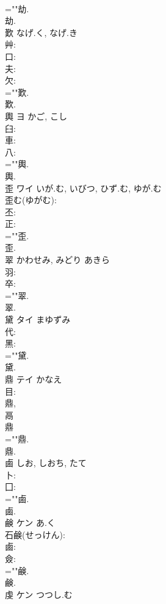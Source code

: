 \documentclass[8pt]{extreport}
\begin{document}
\begin{CJK}{UTF8}{min}
\\	=""劫.
\\	劫.
\\	歎		なげ.く, なげ.き				
\\	艸: 
\\	口: 
\\	夫: 
\\	欠: 
\\	=""歎.
\\	歎.
\\	輿	ヨ	かご, こし		
\\	臼: 
\\	車: 
\\	八: 
\\	=""輿.
\\	輿.
\\	歪	ワイ	いが.む, いびつ, ひず.む, ゆが.む		
\\	歪む(ゆがむ): 
\\	丕: 
\\	正: 
\\	=""歪.
\\	歪.
\\	翠		かわせみ, みどり	あきら			
\\	羽: 
\\	卒: 
\\	=""翠.
\\	翠.
\\	黛	タイ	まゆずみ		
\\	代: 
\\	黑: 
\\	=""黛.
\\	黛.
\\	鼎	テイ	かなえ		
\\	目: 
\\	鼎, 
\\	鬲 
\\	鼎 
\\	=""鼎.
\\	鼎.
\\	鹵		しお, しおち, たて				
\\	卜: 
\\	囗: 
\\	=""鹵.
\\	鹵.
\\	鹸	ケン	あ.く		
\\	石鹸(せっけん): 
\\	鹵: 
\\	僉: 
\\	=""鹸.
\\	鹸.
\\	虔	ケン	つつし.む		

\end{CJK}
\end{document}
